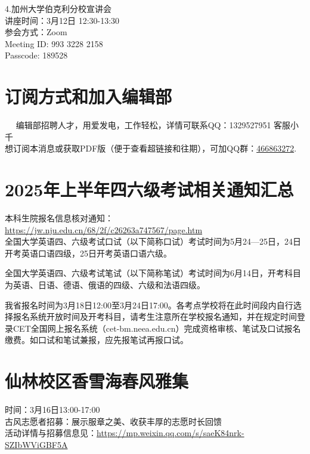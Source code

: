\documentclass[letterpaper, 12pt]{article}
\begin{document}
\begin{multicols}{2}
4.加州大学伯克利分校宣讲会\\
讲座时间：3月12日 12:30-13:30\\
参会方式：Zoom\\
Meeting ID: 993 3228 2158\\
Passcode: 189528\\
\section{订阅方式和加入编辑部}  
编辑部招聘人才，用爱发电，工作轻松，详情可联系QQ：1329527951 客服小千\\想订阅本消息或获取PDF版（便于查看超链接和往期），可加QQ群：\href{https://qm.qq.com/q/4HL41Nt3sQ}{466863272}.
\section{2025年上半年四六级考试相关通知汇总}
本科生院报名信息核对通知：\\
\url{https://jw.nju.edu.cn/68/2f/c26263a747567/page.htm}\\
全国大学英语四、六级考试口试（以下简称口试）考试时间为5月24—25日，24日开考英语口语四级，25日开考英语口语六级。

全国大学英语四、六级考试笔试（以下简称笔试）考试时间为6月14日，开考科目为英语、日语、德语、俄语的四级、六级和法语四级。

我省报名时间为3月18日12:00至3月24日17:00。各考点学校将在此时间段内自行选择报名系统开放时间及开考科目，请考生注意所在学校报名通知，并在规定时间登录CET全国网上报名系统（cet-bm.neea.edu.cn）完成资格审核、笔试及口试报名缴费。如口试和笔试兼报，应先报笔试再报口试。


\section{仙林校区香雪海春风雅集}
时间：3月16日13:00-17:00\\
古风志愿者招募：展示服章之美、收获丰厚的志愿时长回馈\\
活动详情与招募信息见：\url{https://mp.weixin.qq.com/s/saeK84nrk-SZIbWViGBF5A}




\end{multicols}
\end{document}
